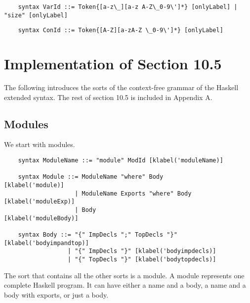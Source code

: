 \begin{lstlisting}
    syntax VarId ::= Token{[a-z\_][a-z A-Z\_0-9\']*} [onlyLabel] | "size" [onlyLabel]
\end{lstlisting}
\begin{lstlisting}
    syntax ConId ::= Token{[A-Z][a-zA-Z \_0-9\']*} [onlyLabel]
\end{lstlisting}

\section{Implementation of Section 10.5}
The following introduces the sorts of the context-free grammar of the Haskell extended syntax. The rest of section 10.5 is included in Appendix A.

\subsection{Modules}
We start with modules.
\begin{lstlisting}
    syntax ModuleName ::= "module" ModId [klabel('moduleName)]

    syntax Module ::= ModuleName "where" Body          [klabel('module)]
                    | ModuleName Exports "where" Body  [klabel('moduleExp)]
                    | Body                             [klabel('moduleBody)]

    syntax Body ::= "{" ImpDecls ";" TopDecls "}" [klabel('bodyimpandtop)]
                  | "{" ImpDecls "}" [klabel('bodyimpdecls)]
                  | "{" TopDecls "}" [klabel('bodytopdecls)]
\end{lstlisting}

The sort that contains all the other sorts is a module. A module represents one complete Haskell program. It can have either a name and a body, a name and a body with exports, or just a body.

